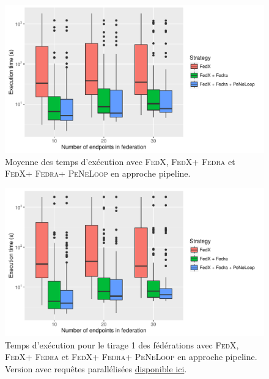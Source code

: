 \documentclass[a4paper]{article}
\def\fedra{\textsc{Fedra}\xspace}
\def\fedx{\textsc{FedX}\xspace}
\def\peneloop{\textsc{PeNeLoop}\xspace}
\newcommand{\parallelLink}[1]{Version avec requêtes parallélisées \href{#1}{disponible ici}.}
\begin{document}
\begin{figure}[h]
    \centering
    \includegraphics{boxplots/avg_execution_time.pdf}
    \caption{Moyenne des temps d'exécution avec \fedx, \fedx + \fedra et \fedx + \fedra + \peneloop en approche pipeline.}
    \label{fig:avg_time}
\end{figure}

\begin{figure}[h]
    \centering
    \includegraphics{boxplots/fed1_execution_time.pdf}
    \caption{Temps d'exécution pour le tirage 1 des fédérations avec \fedx, \fedx + \fedra et \fedx + \fedra + \peneloop en approche pipeline. \parallelLink{https://github.com/Callidon/ParallelNestedLoop/blob/master/results/definitive/fed1_pll_execution_time.pdf}}
    \label{fig:fed1_time}
\end{figure}
\end{document}

